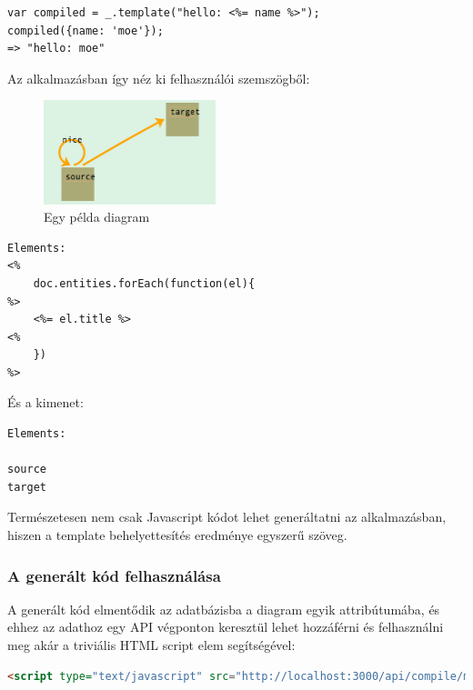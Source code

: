 \begin{lstlisting}
var compiled = _.template("hello: <%= name %>");
compiled({name: 'moe'});
=> "hello: moe"
\end{lstlisting}

Az alkalmazásban így néz ki felhasználói szemszögből:

\begin{figure}[!ht]
\centering
\includegraphics[width=5cm,keepaspectratio]{figures/simple-graph.png}
\caption{Egy példa diagram}
\label{fig:compileseq}
\end{figure}

\begin{lstlisting}[caption=A template]
Elements: 
<% 
    doc.entities.forEach(function(el){
%>
    <%= el.title %>
<%
    })
%>
\end{lstlisting}

És a kimenet: 
\begin{lstlisting}[language=HTML]
Elements: 

source
target
\end{lstlisting}

Természetesen nem csak Javascript kódot lehet generáltatni az alkalmazásban, hiszen a template behelyettesítés eredménye egyszerű szöveg. 






\subsubsection{A generált kód felhasználása}

A generált kód elmentődik az adatbázisba a diagram egyik attribútumába, és ehhez az adathoz egy API végponton keresztül lehet hozzáférni és felhasználni meg akár a triviális HTML script elem segítségével:

\begin{lstlisting}[language=HTML]
 <script type="text/javascript" src="http://localhost:3000/api/compile/modules/5242aa48ddda9b0000000001/"></script>
\end{lstlisting}

